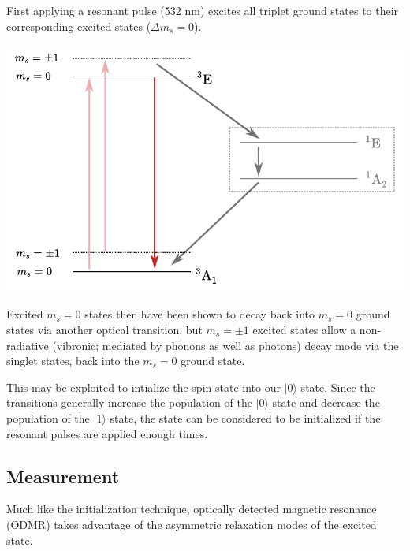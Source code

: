 \documentclass[10pt,a4paper]{article}
\begin{document}
\begin{multicols}{2}
First applying a resonant pulse (532 nm) excites all triplet ground states to their corresponding excited states ($\Delta m_s=0$).
\begin{center}
\includegraphics[scale=0.5]{energy_init_relax.pdf}
\end{center}
Excited $m_s=0$ states then have been shown to decay back into $m_s=0$ ground states via another optical transition, but $m_s=\pm 1$ excited states allow a non-radiative (vibronic; mediated by phonons as well as photons) decay mode via the singlet states, back into the $m_s=0$ ground state. 

This may be exploited to intialize the spin state into our $\vert 0 \rangle$ state. Since the transitions generally increase the population of the $\vert 0 \rangle$ state and decrease the population of the $\vert 1 \rangle$ state, the state can be considered to be initialized if the resonant pulses are applied enough times.



\subsection{Measurement}
Much like the initialization technique, optically detected magnetic resonance (ODMR) takes advantage of the asymmetric relaxation modes of the excited state.


\end{multicols}
\end{document}
